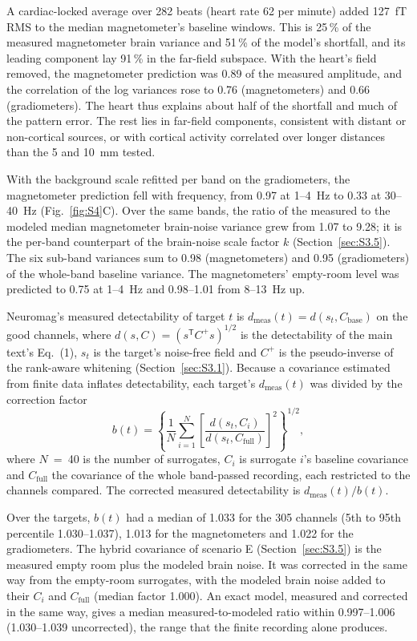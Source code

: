 \documentclass[preprint,12pt,authoryear,a4paper]{elsarticle}
\begin{document}
A cardiac-locked average over 282 beats (heart rate 62 per minute) added 127~fT RMS to the median magnetometer's baseline windows. This is 25\,\% of the measured magnetometer brain variance and 51\,\% of the model's shortfall, and its leading component lay 91\,\% in the far-field subspace. With the heart's field removed, the magnetometer prediction was 0.89 of the measured amplitude, and the correlation of the log variances rose to 0.76 (magnetometers) and 0.66 (gradiometers). The heart thus explains about half of the shortfall and much of the pattern error. The rest lies in far-field components, consistent with distant or non-cortical sources, or with cortical activity correlated over longer distances than the 5 and 10~mm tested.

With the background scale refitted per band on the gradiometers, the magnetometer prediction fell with frequency, from 0.97 at 1–4~Hz to 0.33 at 30–40~Hz (Fig.~\ref{fig:S4}C). Over the same bands, the ratio of the measured to the modeled median magnetometer brain-noise variance grew from 1.07 to 9.28; it is the per-band counterpart of the brain-noise scale factor $k$ (Section~\ref{sec:S3.5}). The six sub-band variances sum to 0.98 (magnetometers) and 0.95 (gradiometers) of the whole-band baseline variance. The magnetometers' empty-room level was predicted to 0.75 at 1–4~Hz and 0.98–1.01 from 8–13~Hz up.

Neuromag's measured detectability of target $t$ is $d_{\mathrm{meas}}(t) = d(s_t, C_{\mathrm{base}})$ on the good channels, where $d(s, C) = (s^{\mathsf{T}} C^{+} s)^{1/2}$ is the detectability of the main text's Eq.~(1), $s_t$ is the target's noise-free field and $C^{+}$ is the pseudo-inverse of the rank-aware whitening (Section~\ref{sec:S3.1}). Because a covariance estimated from finite data inflates detectability, each target's $d_{\mathrm{meas}}(t)$ was divided by the correction factor
\begin{equation}
b(t) = \left\{\frac{1}{N}\sum_{i=1}^{N}\left[\frac{d(s_t, C_i)}{d(s_t, C_{\mathrm{full}})}\right]^{2}\right\}^{1/2},
\label{eq:S-bias}
\end{equation}
where $N$~=~40 is the number of surrogates, $C_i$ is surrogate $i$'s baseline covariance and $C_{\mathrm{full}}$ the covariance of the whole band-passed recording, each restricted to the channels compared. The corrected measured detectability is $d_{\mathrm{meas}}(t)/b(t)$.

Over the targets, $b(t)$ had a median of 1.033 for the 305 channels (5th to 95th percentile 1.030–1.037), 1.013 for the magnetometers and 1.022 for the gradiometers. The hybrid covariance of scenario E (Section~\ref{sec:S3.5}) is the measured empty room plus the modeled brain noise. It was corrected in the same way from the empty-room surrogates, with the modeled brain noise added to their $C_i$ and $C_{\mathrm{full}}$ (median factor 1.000). An exact model, measured and corrected in the same way, gives a median measured-to-modeled ratio within 0.997–1.006 (1.030–1.039 uncorrected), the range that the finite recording alone produces.
\end{document}
